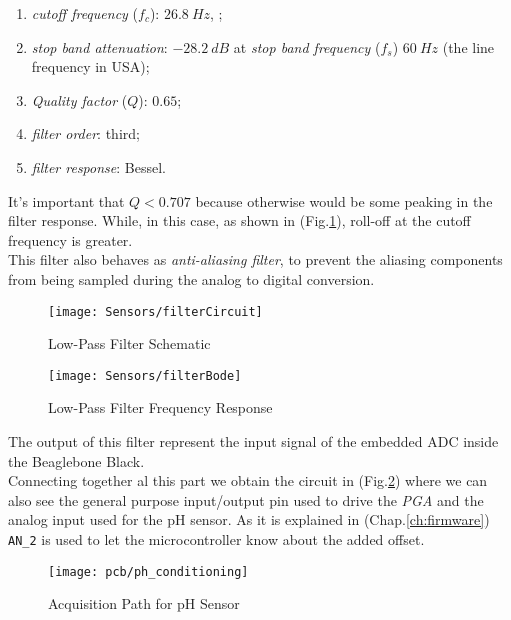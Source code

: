 \begin{enumerate}
	\item \textit{cutoff frequency} ($f_c$): $26.8\ Hz$, ;
\item \textit{stop band attenuation}: $-28.2\ dB$ at \textit{stop band frequency} ($f_s$) $60\ Hz$ (the line frequency in USA);
\item \textit{Quality factor} ($Q$): $0.65$;
\item \textit{filter order}: third;
\item \textit{filter response}: Bessel.
\end{enumerate}

It's important that $Q < 0.707$ because otherwise would be some peaking in the filter response. While, in this case, as shown in (Fig.\ref{Fig:filterbode}), roll-off at the cutoff frequency is greater.\\
This filter also behaves as \textit{anti-aliasing filter}, to prevent the aliasing components from being sampled during the analog to digital conversion.\\



\newpage
\clearpage

\begin{figure}[h]
	\begin{center}
	\texttt{[image: Sensors/filterCircuit]}
	\caption{Low-Pass Filter Schematic}
	\label{Fig:filterCircuit}

	\centering
	\texttt{[image: Sensors/filterBode]}
	\caption{Low-Pass Filter Frequency Response}
	\label{Fig:filterbode}
	\end{center}
\end{figure}
	
	\clearpage
	
The output of this filter represent the input signal of the embedded ADC inside the Beaglebone Black.\\

Connecting together al this part we obtain the circuit in (Fig.\ref{Fig:pHConditioning}) where we can also see the general purpose input/output pin used to drive the \textit{PGA} and the analog input used for the pH sensor. As it is explained in (Chap.\ref{ch:firmware}) \texttt{AN\_2} is used to let the microcontroller know about the added offset.

\begin{figure}[h]

\centering
\texttt{[image: pcb/ph\_conditioning]}
\caption{Acquisition Path for pH Sensor}
\label{Fig:pHConditioning}
\end{figure}






